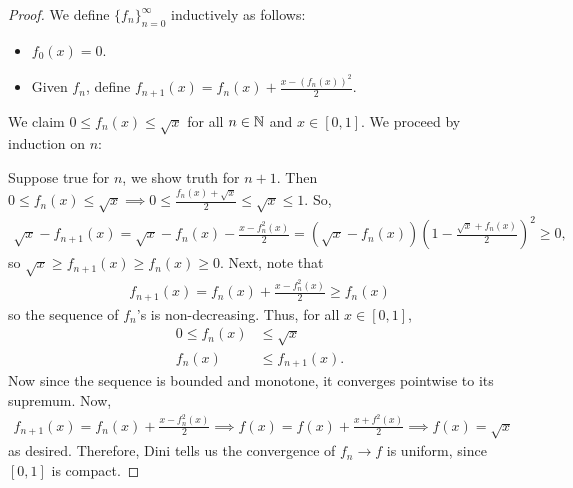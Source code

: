 \documentclass{report}
\begin{document}
\begin{proof}
    We define $\{f_n\}_{n=0}^\infty$ inductively as follows:
    \begin{itemize}
        \item $f_0(x) = 0$.
        \item Given $f_n$, define $f_{n+1}(x) = f_n(x) + \frac{x - (f_n(x))^2}{2}$.
    \end{itemize}
    We claim $0 \leq f_n(x) \leq \sqrt x$ for all $n \in \NN$ and $x \in [0,1]$. We proceed by induction on $n$:

    Suppose true for $n$, we show truth for $n+1$. Then $0 \leq f_n(x) \leq \sqrt x \implies 0 \leq \frac{f_n(x) + \sqrt x}{2} \leq \sqrt x \leq 1$. So,
    \begin{align*}
        \sqrt x  - f_{n+1}(x) = \sqrt x  - f_n(x) - \frac{x - f_n^2(x)}{2}= (\sqrt x - f_n(x))\left( 1 - \frac{\sqrt x  + f_n(x)}{2} \right)^2 \geq 0,
    \end{align*}
    so $\sqrt x \geq f_{n+1}(x) \geq f_n(x) \geq 0$. Next, note that 
    \begin{align*}
        f_{n+1}(x) = f_n(x) + \frac{x - f_n^2(x)}{2} \geq f_{n}(x)
    \end{align*}
    so the sequence of $f_n$'s is non-decreasing. Thus, for all $x \in [0,1]$, 
    \begin{align*}
        0 \leq f_n(x) &\leq \sqrt x \\
        f_n(x) &\leq f_{n+1}(x).
    \end{align*}
    Now since the sequence is bounded and monotone, it converges pointwise to its supremum. Now,
    \begin{align*}
        f_{n+1}(x) = f_n(x) + \frac{x - f_n^2(x)}{2} \implies f(x) = f(x) + \frac{x + f^2(x)}{2} \implies f(x) = \sqrt x
    \end{align*}
    as desired. Therefore, Dini tells us the convergence of $f_n \to f$ is uniform, since $[0,1]$ is compact.
\end{proof}
\newpage
{}
\end{document}
